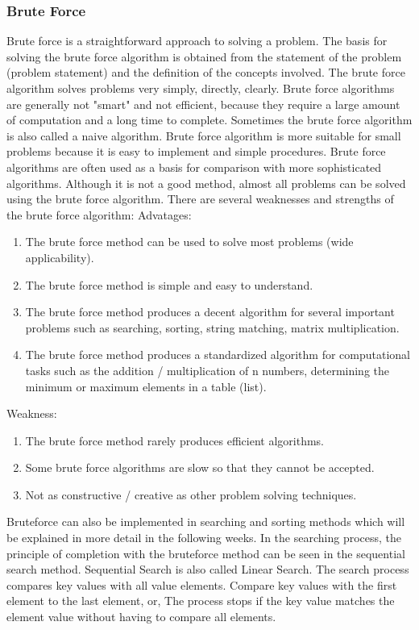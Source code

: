 \documentclass[12pt,titlepage]{article}
\begin{document}
\subsubsection{Brute Force}
Brute force is a straightforward approach to solving a problem. The basis for solving the brute force algorithm is obtained from the statement of the problem (problem statement) and the definition of the concepts involved. The brute force algorithm solves problems very simply, directly, clearly.
Brute force algorithms are generally not "smart" and not efficient, because they require a large amount of computation and a long time to complete. Sometimes the brute force algorithm is also called a naive algorithm. Brute force algorithm is more suitable for small problems because it is easy to implement and simple procedures. Brute force algorithms are often used as a basis for comparison with more sophisticated algorithms. Although it is not a good method, almost all problems can be solved using the brute force algorithm. There are several weaknesses and strengths of the brute force algorithm:
    Advatages:
    \begin{enumerate}
        \item The brute force method can be used to solve most problems (wide applicability).
        \item The brute force method is simple and easy to understand.
        \item The brute force method produces a decent algorithm for several important problems such as searching, sorting, string matching, matrix multiplication.
        \item The brute force method produces a standardized algorithm for computational tasks such as the addition / multiplication of n numbers, determining the minimum or maximum elements in a table (list).
    \end{enumerate}
    Weakness:
    \begin{enumerate}
        \item The brute force method rarely produces efficient algorithms.
        \item Some brute force algorithms are slow so that they cannot be accepted.
        \item Not as constructive / creative as other problem solving techniques.
    \end{enumerate}
Bruteforce can also be implemented in searching and sorting methods which will be explained in more detail in the following weeks. In the searching process, the principle of completion with the bruteforce method can be seen in the sequential search method. Sequential Search is also called Linear Search. The search process compares key values with all value elements. Compare key values with the first element to the last element, or, The process stops if the key value matches the element value without having to compare all elements.
\end{document}
